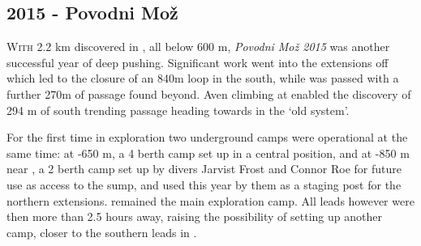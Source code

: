 \newpage
\begin{tcolorbox}
\chapter{2015 - Povodni Mo\v{z}}
		\lettrine{W}{ith} 2.2 km discovered in , all below 600 m, \emph{Povodni Mo\v{z} 2015} was another successful year of deep pushing. Significant work went into the extensions off  which led to the closure of an 840m loop in the south, while  was passed with a further 270m of passage found beyond. Aven climbing at  enabled the discovery of 294 m of south trending passage heading towards  in the ‘old system’. 

		For the first time in  exploration two underground camps were operational at the same time: at -650 m, a 4 berth camp set up in a central position, and  at -850 m near , a 2 berth camp set up by divers Jarvist Frost and Connor Roe for future use as access to the  sump, and used this year by them as a staging post for the northern extensions.  remained the main exploration camp. All leads however were then more than 2.5 hours away, raising the possibility of setting up another camp, closer to the southern leads in .
	

\end{tcolorbox}
\BgThispage



